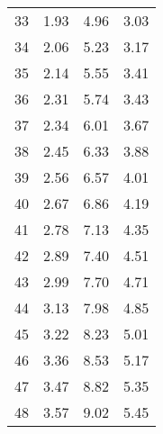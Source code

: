 \begin{longtable}[c]{cccc}
	33                       & 1.93                                 & 4.96                                 & 3.03                       \\
	34                       & 2.06                                 & 5.23                                 & 3.17                       \\
	35                       & 2.14                                 & 5.55                                 & 3.41                       \\
	36                       & 2.31                                 & 5.74                                 & 3.43                       \\
	37                       & 2.34                                 & 6.01                                 & 3.67                       \\
	38                       & 2.45                                 & 6.33                                 & 3.88                       \\
	39                       & 2.56                                 & 6.57                                 & 4.01                       \\
	40                       & 2.67                                 & 6.86                                 & 4.19                       \\
	41                       & 2.78                                 & 7.13                                 & 4.35                       \\
	42                       & 2.89                                 & 7.40                                 & 4.51                       \\
	43                       & 2.99                                 & 7.70                                 & 4.71                       \\
	44                       & 3.13                                 & 7.98                                 & 4.85                       \\
	45                       & 3.22                                 & 8.23                                 & 5.01                       \\
	46                       & 3.36                                 & 8.53                                 & 5.17                       \\
	47                       & 3.47                                 & 8.82                                 & 5.35                       \\
	48                       & 3.57                                 & 9.02                                 & 5.45                       \\

\end{longtable}



